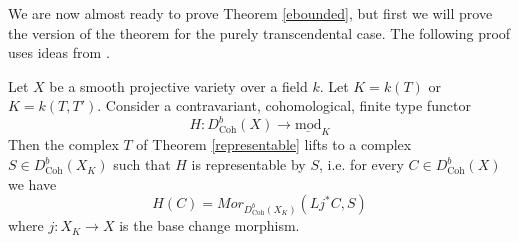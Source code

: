 \documentclass{amsart}
\begin{document}
We are now almost ready to prove Theorem \ref{ebounded}, but first we will prove the version of the theorem for the purely transcendental case. The following proof uses ideas from \cite[Theorem A.1]{generators}.

\begin{theorem}
\label{transcendental}
Let $X$ be a smooth projective variety over a field $k$. Let $K=k(T)$ or $K=k(T,T')$. Consider a contravariant, cohomological, finite type functor
$$H:D^{b}_{\mathrm{Coh}}(X){\rightarrow} \underline{\mathrm{mod}}_{K}$$
Then the complex $T$ of Theorem \ref{representable} lifts to a complex $S\in D^{b}_{\mathrm{Coh}}(X_{K})$ such that $H$ is representable by $S$, i.e. for every $C\in D^{b}_{\mathrm{Coh}}(X)$ we have
$$H(C)=Mor_{D^{b}_{\mathrm{Coh}}(X_{K})}(Lj^{*}C,S)$$
where $j:X_{K}{\rightarrow} X$ is the base change morphism.
\end{theorem}
\end{document}
